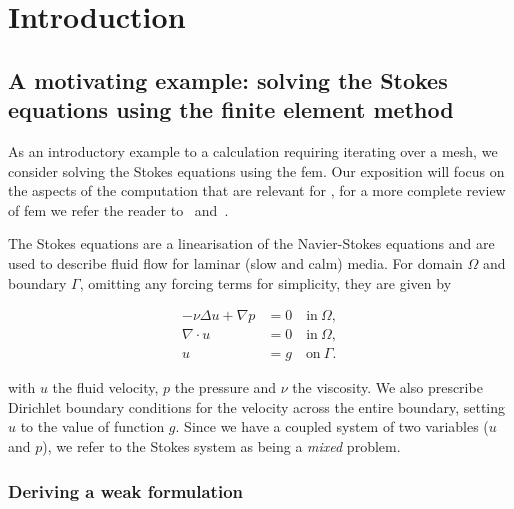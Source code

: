 \documentclass[thesis]{subfiles}
\begin{document}
\chapter{Introduction}
\label{chapter:introduction}



\section{A motivating example: solving the Stokes equations using the finite element method}
\label{sec:stokes_equations}

As an introductory example to a calculation requiring iterating over a mesh, we consider solving the Stokes equations using the \gls{fem}.
Our exposition will focus on the aspects of the computation that are relevant for , for a more complete review of \gls{fem} we refer the reader to~\cite{brennerMathematicalTheoryFinite2008} and~\cite{larsonFiniteElementMethod2013}.

The Stokes equations are a linearisation of the Navier-Stokes equations and are used to describe fluid flow for laminar (slow and calm) media.
For domain $\Omega$ and boundary $\Gamma$, omitting any forcing terms for simplicity, they are given by

\begin{subequations}
  \begin{align}
    - \nu \Delta u + \nabla p &= 0 \quad \textrm{in} \ \Omega, \\
    \nabla \cdot u &= 0 \quad \textrm{in} \ \Omega, \\
    u &= g \quad \textrm{on} \ \Gamma.
  \end{align}
  \label{eq:strong_stokes}
\end{subequations}

with $u$ the fluid velocity, $p$ the pressure and $\nu$ the viscosity.
We also prescribe Dirichlet boundary conditions for the velocity across the entire boundary, setting $u$ to the value of function $g$.
Since we have a coupled system of two variables ($u$ and $p$), we refer to the Stokes system as being a \textit{mixed} problem.

\subsection{Deriving a weak formulation}
\end{document}
